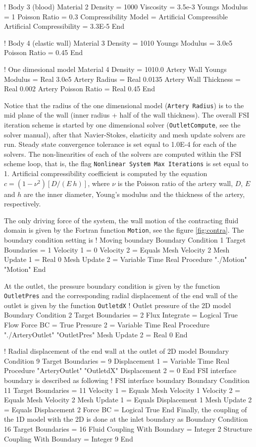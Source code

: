! Body 3 (blood)
Material 2
  Density = 1000
  Viscosity = 3.5e-3
  Youngs Modulus = 1
  Poisson Ratio = 0.3
  Compressibility Model = Artificial Compressible
  Artificial Compressibility  = 3.3E-5 
End

! Body 4 (elastic wall)
Material 3
  Density = 1010
  Youngs Modulus = 3.0e5
  Poisson Ratio = 0.45
End

! One dimesional model
Material 4
   Density = 1010.0
   Artery Wall Youngs Modulus = Real 3.0e5 
   Artery Radius = Real 0.0135 
   Artery Wall Thickness = Real 0.002
   Artery Poisson Ratio  = Real 0.45
End
\ttend

Notice that the radius of the one dimensional model ({\tt Artery Radius})
is to the mid plane of the wall (inner radius + half of the wall thickness).
The overall FSI iteration scheme is started by one dimensional solver
({\tt OutletCompute}, see the solver manual), after that Navier-Stokes, 
elasticity and mesh update solvers are run.  Steady state convergence tolerance
is set equal to 1.0E-4 for each of the solvers.  The non-linearities
of each of the solvers are computed within the FSI scheme loop, that is,
the flag {\tt Nonlinear System Max Iterations} is set equal to 1.
Artificial compressibility coefficient is computed by the equation
$c = (1-\nu^2) [D/(E~h)]$, where $\nu$ is the Poisson ratio of the
artery wall, $D$, $E$ and $h$ are the inner diameter, Young's modulus
and the thickness of the artery, respectively.

The only driving force of the system, the wall motion of the contracting 
fluid domain is given by the Fortran function {\tt Motion}, see the
figure \ref{fig:contra}.  The boundary condition setting is
\ttbegin
! Moving boundary
Boundary Condition 1
  Target Boundaries = 1
  Velocity 1 = 0
  Velocity 2 = Equals Mesh Velocity 2
  Mesh Update 1 = Real 0
  Mesh Update 2 = Variable Time
       Real Procedure "./Motion" "Motion"
End
\ttend

At the outlet, the pressure boundary condition is given by the
function {\tt OutletPres} and the corresponding radial displacement
of the end wall of the outlet is given by the function {\tt OutletdX}
\ttbegin
! Outlet pressure of the 2D model
Boundary Condition 2
  Target Boundaries = 2
  Flux Integrate = Logical True
  Flow Force BC = True
  Pressure 2 = Variable Time
      Real Procedure "./ArteryOutlet" "OutletPres"
  Mesh Update 2 = Real 0
End

! Radial displacement of the end wall at the outlet of 2D model
Boundary Condition 9
  Target Boundaries = 9
  Displacement 1 = Variable Time
      Real Procedure "ArteryOutlet" "OutletdX"
  Displacement 2 = 0 
End
\ttend
FSI interface boundary is described as following
\ttbegin
! FSI interface boundary
Boundary Condition 11
  Target Boundaries = 11
  Velocity 1 = Equals Mesh Velocity 1
  Velocity 2 = Equals Mesh Velocity 2
  Mesh Update 1 = Equals Displacement 1
  Mesh Update 2 = Equals Displacement 2
  Force BC = Logical True
End
\ttend
Finally, the coupling of the 1D model with the 2D is 
done at the inlet boundary as
\ttbegin
Boundary Condition 16
  Target Boundaries = 16
  Fluid Coupling With Boundary = Integer 2
  Structure Coupling With Boundary = Integer 9
End
\ttend


